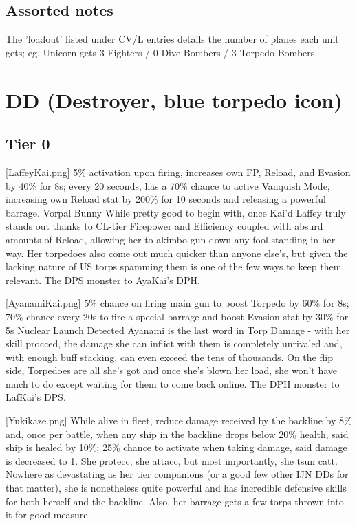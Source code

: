 \subsection{Assorted notes}
The 'loadout' listed under CV/L entries details the number of planes each unit gets; eg. Unicorn gets 3 Fighters / 0 Dive Bombers / 3 Torpedo Bombers.

\newpage
\pagestyle{content}
\section[DD]{DD (Destroyer, blue torpedo icon)}

\subsection{Tier 0}
[LaffeyKai.png]
{5\% activation upon firing, increases own FP, Reload, and Evasion by 40\% for 8s; every 20 seconds, has a 70\% chance to active Vanquish Mode, increasing own Reload stat by 200\% for 10 seconds and releasing a powerful barrage.}
{Vorpal Bunny}
{While pretty good to begin with, once Kai'd Laffey truly stands out thanks to CL-tier Firepower and Efficiency coupled with absurd amounts of Reload, allowing her to akimbo gun down any fool standing in her way. Her torpedoes also come out much quicker than anyone else's, but given the lacking nature of US torps spamming them is one of the few ways to keep them relevant. The DPS monster to AyaKai's DPH.}

[AyanamiKai.png]
{5\% chance on firing main gun to boost Torpedo by 60\% for 8s; 70\% chance every 20s to fire a special barrage and boost Evasion stat by 30\% for 5s}
{Nuclear Launch Detected}
{Ayanami is the last word in Torp Damage - with her skill procced, the damage she can inflict with them is completely unrivaled and, with enough buff stacking, can even exceed the tens of thousands. 
On the flip side, Torpedoes are all she's got and once she's blown her load, she won't have much to do except waiting for them to come back online. The DPH monster to LafKai's DPS.}
 
[Yukikaze.png]
{While alive in fleet, reduce damage received by the backline by 8\% and, once per battle, when any ship in the backline drops below 20\% health, said ship is healed by 10\%; 25\% chance to activate when taking damage, said damage is decreased to 1.}
{She protecc, she attacc, but most importantly, she tsun catt.}
{Nowhere as devastating as her tier companions (or a good few other IJN DDs for that matter), she is nonetheless quite powerful and has incredible defensive skills for both herself and the backline. Also, her barrage gets a few torps thrown into it for good measure.}
 
